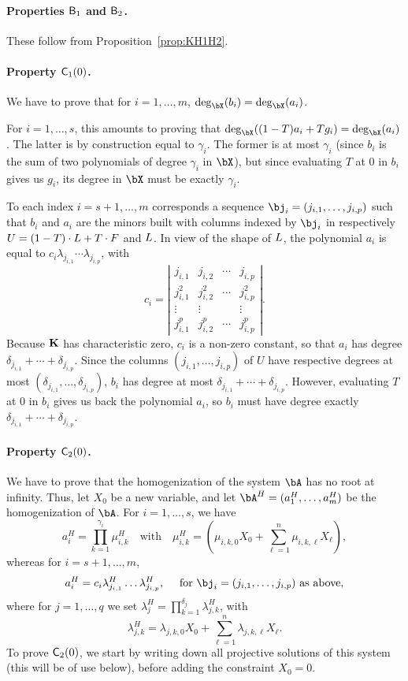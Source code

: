 \documentclass[12pt]{article}
\begin{document}
\paragraph{Properties $\mathsf{B}_1$ and $\mathsf{B}_2$.}
These follow from Proposition~\ref{prop:KH1H2}.

\paragraph{Property $\mathsf{C}_1(0)$.} We have to prove that for $i=1,\dots,m$,
$\deg_\bX(b_i)=\deg_\bX(a_i)$. 

For $i=1,\dots,s$, this amounts to proving that $\deg_\bX((1-T) a_i +
T g_i)=\deg_\bX(a_i)$. The latter is by construction equal to
$\gamma_i$. The former is at most $\gamma_i$ (since $b_i$ is the sum
of two polynomials of degree $\gamma_i$ in $\bX$), but since
evaluating $T$ at $0$ in $b_i$ gives us $g_i$, its degree in $\bX$
must be exactly $\gamma_i$.

To each index $i=s+1,\dots,m$ corresponds a sequence
$\bj_i=(j_{i,1},\dots,j_{i,p})$ such that $b_i$ and $a_i$ are the
minors built with columns indexed by $\bj_i$ in respectively
${U}=(1-T)\cdot {L} + T \cdot {F}$ and ${L}$. In view of the shape of
${L}$, the polynomial $a_i$ is equal to $c_i\lambda_{j_{i,1}}\cdots
\lambda_{j_{i,p}}$, with
$$c_i = \left | 
\begin{matrix}
j_{i,1} & j_{i,2} & \cdots & j_{i,p}\\
j_{i,1}^2 & j_{i,2}^2 & \cdots & j_{i,p}^2\\
\vdots & \vdots &  & \vdots \\
j_{i,1}^p & j_{i,2}^p & \cdots & j_{i,p}^p
\end{matrix}
\right |.$$
Because $\mathbf{K}$ has characteristic zero,
 $c_i$ is a non-zero constant, so that $a_i$ has degree $\delta_{j_{i,1}} +
\cdots + \delta_{j_{i,p}}$.  Since the columns
$(j_{i,1},\dots,j_{i,p})$ of $U$ have respective degrees at most
$(\delta_{j_{i,1}},\dots,\delta_{j_{i,p}})$, $b_i$ has degree at most
$\delta_{j_{i,1}} + \cdots + \delta_{j_{i,p}}$. However, evaluating
$T$ at $0$ in $b_i$ gives us back the polynomial $a_i$, so $b_i$ must
have degree exactly $\delta_{j_{i,1}} + \cdots + \delta_{j_{i,p}}$.

\paragraph{Property $\mathsf{C}_2(0)$.} We have to prove that the homogenization
of the system $\bA$ has no root at infinity. Thus, let $X_0$ be a new
variable, and let $\bA^H=(a_1^H,\dots,a_m^H)$ be the homogenization
of $\bA$. For $i=1,\dots,s$, we have
$$a_i^H=\prod_{k=1}^{\gamma_i} \mu^H_{i,k} \quad\text{with}\quad \mu^H_{i,k}=(\mu_{i,k,0}X_0 + \sum_{\ell = 1}^{n}\mu_{i,k,\ell}X_\ell),$$
whereas for $i=s+1,\dots,m$, 
$$a_i^H=c_i \lambda^H_{j_{i,1}}\ldots \lambda^H_{j_{i,p}}, \quad \text{~for~} \bj_i=(j_{i,1},\dots,j_{i,p}) \text{~as above},$$
where for $j=1,\dots,q$ we set 
$\lambda^H_j = \prod_{k=1}^{\delta_j}\lambda^H_{j,k}$,
with
$$\lambda^H_{j,k}=\lambda_{j,k,0}X_0 + \sum_{\ell = 1}^{n}\lambda_{j,k,\ell}X_\ell.$$
To prove  $\mathsf{C}_2(0)$, we start by writing down all projective
solutions of this system (this will be of use below), before adding
the constraint $X_0=0$.
\end{document}
